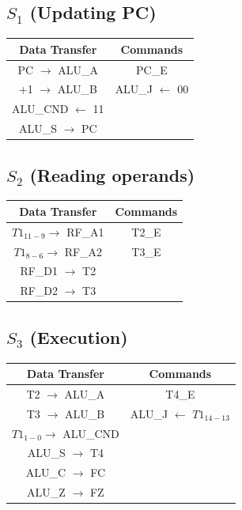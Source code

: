\documentclass[]{report}
\begin{document}
        \subsection*{$S_1$ (Updating PC)}   %
        \begin{center}
            \begin{tabular}{|c|c|}
                \hline
                Data Transfer & Commands \\
                \hline
                PC $\to$ ALU\_A & PC\_E\\
                +1 $\to$ ALU\_B & ALU\_J $\leftarrow$ 00\\
                ALU\_CND $\leftarrow$ 11 & \\
                ALU\_S $\to$ PC &\\
                \hline
            \end{tabular}
        \end{center}
        \subsection*{$S_2$ (Reading operands)}
        \begin{center}
            \begin{tabular}{|c|c|}
                \hline
                Data Transfer & Commands \\
                \hline
                $T1_{11-9} \to$ RF\_A1  & T2\_E\\
                $T1_{8-6} \to$ RF\_A2 & T3\_E\\
                RF\_D1 $\to$ T2 & \\
                RF\_D2 $\to$ T3 & \\
                \hline
            \end{tabular}
        \end{center}
        \subsection*{$S_3$ (Execution)} %
        \begin{center}
            \begin{tabular}{|c|c|}
                \hline
                Data Transfer & Commands \\
                \hline
                T2 $\to$ ALU\_A & T4\_E\\
                T3 $\to$ ALU\_B & ALU\_J $\leftarrow$ $T1_{14-13}$\\
                $T1_{1-0} \to $ ALU\_CND & \\
                ALU\_S $\to$ T4 & \\
                ALU\_C $\to$ FC & \\
                ALU\_Z $\to$ FZ & \\
                \hline
            \end{tabular}
        \end{center}
\end{document}
